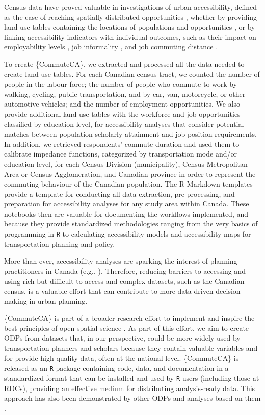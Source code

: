 \documentclass[sn-basic,lineno,pdflatex]{sn-jnl}
\begin{document}
Census data have proved valuable in investigations of urban
accessibility, defined as the ease of reaching spatially distributed
opportunities \citep{hansen1959}, whether by providing land use tables
containing the locations of populations and opportunities
\citep{merlin2017, jassochávez2025, cui2020, delmelle2021}, or by
linking accessibility indicators with individual outcomes, such as their
impact on employability levels
\citep{bastiaanssen2025, bastiaanssen2021}, job informality
\citep{boisjoly2017, duarte2023}, and job commuting distance
\citep{hu2017}.

To create \{CommuteCA\}, we extracted and processed all the data needed
to create land use tables. For each Canadian census tract, we counted
the number of people in the labour force; the number of people who
commute to work by walking, cycling, public transportation, and by car,
van, motorcycle, or other automotive vehicles; and the number of
employment opportunities. We also provide additional land use tables
with the workforce and job opportunities classified by education level,
for accessibility analyses that consider potential matches between
population scholarly attainment and job position requirements. In
addition, we retrieved respondents' commute duration and used them to
calibrate impedance functions, categorized by transportation mode and/or
education level, for each Census Division (municipality), Census
Metropolitan Area or Census Agglomeration, and Canadian province in
order to represent the commuting behaviour of the Canadian population.
The R Markdown templates provide a template for conducting all data
extraction, pre-processing, and preparation for accessibility analyses
for any study area within Canada. These notebooks then are valuable for
documenting the workflows implemented, and because they provide
standardized methodologies ranging from the very basics of programming
in \texttt{R} to calculating accessibility models and accessibility maps
for transportation planning and policy.

More than ever, accessibility analyses are sparking the interest of
planning practitioners in Canada (e.g., \citet{nicknewstead2024}).
Therefore, reducing barriers to accessing and using rich but
difficult-to-access and complex datasets, such as the Canadian census,
is a valuable effort that can contribute to more data-driven
decision-making in urban planning.

\{CommuteCA\} is part of a broader research effort to implement and
inspire the best principles of open spatial science
\citep{paez_open_2021, brunsdon_opening_2021}. As part of this effort,
we aim to create ODPs from datasets that, in our perspective, could be
more widely used by transportation planners and scholars because they
contain valuable variables and for provide high-quality data, often at
the national level. \{CommuteCA\} is released as an \texttt{R} package
containing code, data, and documentation in a standardized format that
can be installed and used by \texttt{R} users (including those at RDCs),
providing an effective medium for distributing analysis-ready data. This
approach has also been demonstrated by other ODPs
\citep{dossantos2025, soukhov2023} and analyses based on them
\citep{dossantos2026, soukhov2023a}.
\end{document}
